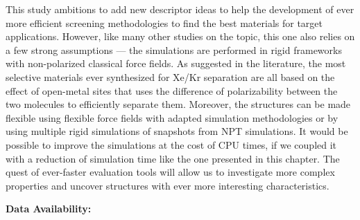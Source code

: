 \documentclass[main]{subfiles}
\begin{document}
This study ambitions to add new descriptor ideas to help the development of ever more efficient screening methodologies to find the best materials for target applications. However, like many other studies on the topic, this one also relies on a few strong assumptions --- the simulations are performed in rigid frameworks with non-polarized classical force fields. As suggested in the literature, the most selective materials ever synthesized for Xe/Kr separation are all based on the effect of open-metal sites that uses the difference of polarizability between the two molecules to efficiently separate them.\autocite{Li_2019, Pei_2022} Moreover, the structures can be made flexible using flexible force fields with adapted simulation methodologies\autocite{Bousquet2012} or by using multiple rigid simulations of snapshots from NPT simulations\autocite{Witman_2017}.
It would be possible to improve the simulations at the cost of CPU times, if we coupled it with a reduction of simulation time like the one presented in this chapter. The quest of ever-faster evaluation tools will allow us to investigate more complex properties and uncover structures with ever more interesting characteristics.

\textbf{Data Availability:} \url{}

\OnlyInSubfile{\printglobalbibliography}
\end{document}
